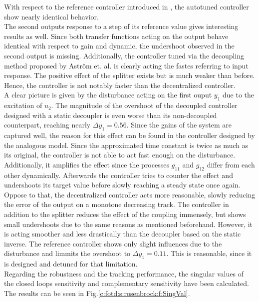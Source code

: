 With respect to the reference controller introduced in \cite{Astrom2001a}, the autotuned controller show nearly identical behavior.\\

The second outputs response to a step of its reference value gives interesting results as well. Since both transfer functions acting on the output behave identical with respect to gain and dynamic, the undershoot observed in the second output is missing. Additionally, the controller tuned via the decoupling method proposed by Astr\"om et. al. is clearly acting the fastes referring to input response. The positive effect of the splitter exists but is much weaker than before. Hence, the controller is not notably faster than the decentralized controller.\\

A clear picture is given by the disturbance acting on the first ouput $y_1$ due to the excitation of $u_2$. The magnitude of the overshoot of the decoupled controller designed with a static decoupler is even worse than its non-decoupled counterpart, reaching nearly $\Delta y_1 = 0.56$. Since the gains of the system are captured well, the reason for this effect can be found in the controller designed by the analogous model. Since the approximated time constant is twice as much as its original, the controller is not able to act fast enough on the disturbance. Additionally, it amplifies the effect since the processes $g_{11}$ and $g_{12}$ differ from each other dynamically. Afterwards the controller tries to counter the effect and undershoots its target value before slowly reaching a steady state once again.\\

Oppose to that, the decentralized controller acts more reasonable, slowly reducing the error of the output on a monotone decreasing track. The controller in addition to the splitter reduces the effect of the coupling immensely, but shows small undershoots due to the same reasons as mentioned beforehand. However, it is acting smoother and less drastically than the decoupler based on the static inverse. The reference controller shows only slight influences due to the disturbance and limmits the overshoot to $\Delta y_1 = 0.11$. This is reasonable, since it is designed and detuned for that limitation.\\

Regarding the robustness and the tracking performance, the singular values of the closed loops sensitivity and complementary sensitivity have been calculated. The results can be seen in Fig.\ref{c:fotd:s:rosenbrock:f:SingVal}.\\

